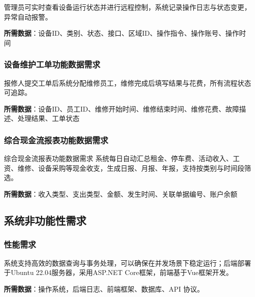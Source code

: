 \documentclass[]{article}
\begin{document}
管理员可实时查看设备运行状态并进行远程控制，系统记录操作日志与状态变更，异常自动报警。

\textbf{所需数据}：设备ID、类别、状态、接口、区域ID、操作指令、操作账号、操作时间

\hypertarget{ux8bbeux5907ux7ef4ux62a4ux5de5ux5355ux529fux80fdux6570ux636eux9700ux6c42}{%
  \subsubsection{设备维护工单功能数据需求}\label{ux8bbeux5907ux7ef4ux62a4ux5de5ux5355ux529fux80fdux6570ux636eux9700ux6c42}}

报修人提交工单后系统分配维修员工，维修完成后填写结果与花费，所有流程状态可追踪。

\textbf{所需数据}：设备ID、员工ID、维修开始时间、维修结束时间、维修花费、故障描述、处理结果、工单状态

\hypertarget{ux7efcux5408ux73b0ux91d1ux6d41ux62a5ux8868ux529fux80fdux6570ux636eux9700ux6c42}{%
  \subsubsection{综合现金流报表功能数据需求}\label{ux7efcux5408ux73b0ux91d1ux6d41ux62a5ux8868ux529fux80fdux6570ux636eux9700ux6c42}}

综合现金流报表功能数据需求
系统每日自动汇总租金、停车费、活动收入、工资、维修、设备采购等现金收支，生成日报、月报、年报，支持按类别与时间段筛选。

\textbf{所需数据}：收入类型、支出类型、金额、发生时间、关联单据编号、账户余额

\hypertarget{ux7cfbux7edfux975eux529fux80fdux6027ux9700ux6c42}{%
  \subsection{系统非功能性需求}\label{ux7cfbux7edfux975eux529fux80fdux6027ux9700ux6c42}}

\hypertarget{ux6027ux80fdux9700ux6c42}{%
  \subsubsection{性能需求}\label{ux6027ux80fdux9700ux6c42}}

系统支持高效的数据查询与事务处理，可以确保在并发场景下稳定运行；后端部署于Ubuntu
22.04服务器，采用ASP.NET Core框架，前端基于Vue框架开发。

\textbf{所需数据}：操作系统，后端日志、前端框架、数据库、API 协议。
\end{document}
